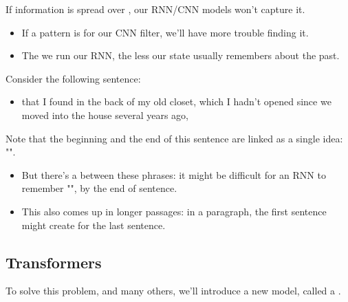     \begin{concept}
        If information is spread over , our RNN/CNN models won't capture it.

        \begin{itemize}
            \item If a pattern is  for our CNN filter, we'll have more trouble finding it.

            \item The  we run our RNN, the less our state usually remembers about the  past.
        \end{itemize}
    \end{concept}

    \miniex Consider the following sentence: 

    \phantom{}

    \begin{itemize}
        \item {} that I found in the back of my old closet, which I hadn't opened since we moved into the house several years ago, 
    \end{itemize}

    \phantom{}

    Note that the beginning and the end of this sentence are linked as a single idea: "".

    \begin{itemize}
        \item But there's a  between these phrases: it might be difficult for an RNN to remember "", by the end of sentence.

        \item This also comes up in longer passages: in a paragraph, the first sentence might create  for the last sentence.
    \end{itemize}



\phantom{}

\subsection{Transformers}

    To solve this problem, and many others, we'll introduce a new model, called a .

